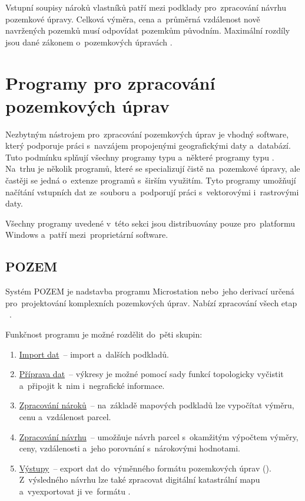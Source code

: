 Vstupní soupisy nároků vlastníků patří mezi podklady pro~zpracování návrhu pozemkové úpravy. Celková výměra, cena a~průměrná vzdálenost nově navržených pozemků musí odpovídat pozemkům původním. Maximální rozdíly jsou dané záko\-nem o~pozemkových úpravách \citep{pu_zakon}.

\section{Programy pro zpracování pozemkových úprav}
\label{programy_pu}

Nezbytným nástrojem pro~zpracování pozemkových úprav je vhodný software, který podporuje práci s~navzájem propojenými geografickými daty a~databází. Tuto podmínku splňují všechny programy typu  a~některé programy typu . Na~trhu je několik programů, které se specializují čistě na~pozemkové úpravy, ale častěji se jedná o~extenze programů s~širším využitím. Tyto programy umožňují načítání vstupních dat ze~souboru  a~podporují práci s~vektorovými i~rastrovými daty.

Všechny programy uvedené v~této sekci jsou distribuovány pouze pro~platformu Windows a~patří mezi~proprietární software.

\subsection{POZEM}
\label{pozem}

Systém POZEM je nadstavba programu Microstation nebo~jeho derivací určená pro~projektování komplexních pozemkových úprav. Nabízí zpracování všech etap  \citep{pozem}~\citep{pu_skripta}.

Funkčnost programu je možné rozdělit do~pěti skupin:
\vspace{-\topsep}
	\begin{enumerate}[leftmargin=1.5cm, noitemsep]
		\item \underline{Import dat}~– import  a~dalších podkladů.
		\item \underline{Příprava dat}~– výkresy je možné pomocí sady funkcí topologicky vyčistit a~připojit k~nim i~negrafické informace.
		\item \underline{Zpracování nároků}~– na~základě mapových podkladů lze vypočítat výměru, cenu a~vzdálenost parcel. 
		\item \underline{Zpracování návrhu}~– umožňuje návrh parcel s~okamžitým výpočtem výměry, ceny, vzdálenosti a~jeho porovnání s~nárokovými hodnotami.
		\item \underline{Výstupy}~– export dat do~výměnného formátu pozemkových úprav (). Z~výsledného návrhu lze také zpracovat digitální katastrální mapu a~vyexportovat ji ve~formátu .
	\end{enumerate}

